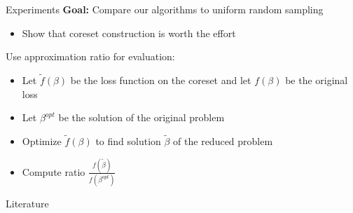 \documentclass[gray]{beamer}
\begin{document}
\begin{frame}{Experiments}
    \textbf{Goal:} Compare our algorithms to uniform random sampling
    \begin{itemize}
        \item Show that coreset construction is worth the effort
    \end{itemize}

    \vspace{\fill}

    Use approximation ratio for evaluation:
    \begin{itemize}
        \item Let $\tilde{f}(\beta)$ be the loss function on the coreset
              and let $f(\beta)$ be the original loss
        \item Let $\beta^{opt}$ be the solution of the original problem
        \item Optimize $\tilde{f}(\beta)$ to find solution $\tilde{\beta}$
              of the reduced problem
        \item Compute ratio $\frac{f(\tilde{\beta})}{f(\beta^{opt})}$
    \end{itemize}

\end{frame}


\begin{frame}{Literature}
    \nocite{*}
    
    
\end{frame}
\end{document}
